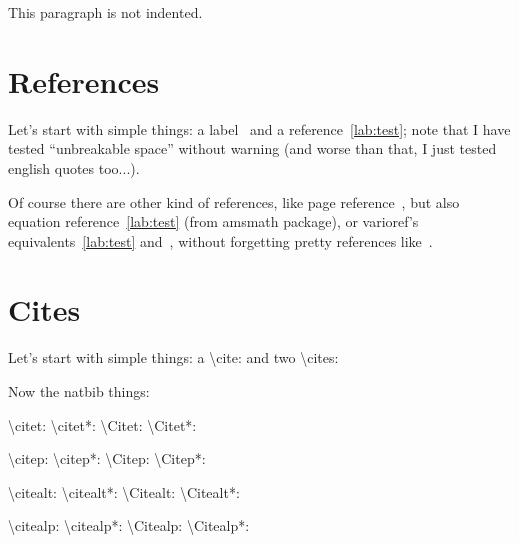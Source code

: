 \documentclass[a4paper,12pt]{article}
\begin{document}
\tableofcontents

\noindent This paragraph is not indented.

\section{References}

Let's start with simple things: a label~\label{lab:test} and a
reference~\ref{lab:test}; note that I have tested ``unbreakable
space'' without warning (and worse than that, I just tested english
quotes too...).

Of course there are other kind of references, like page
reference~\pageref{lab:test}, but also equation
reference~\eqref{lab:test} (from amsmath package), or varioref's
equivalents~\vref{lab:test} and~, without
forgetting pretty references like~.

\section{Cites}

Let's start with simple things: a \textbackslash{}cite: \cite[after]{article-crossref}
and two \textbackslash{}cites: \cite[after]{whole-set,article-crossref}

Now the natbib things:

\textbackslash{}citet: \citet[before][after]{article-crossref} \textbackslash{}citet{*}:
\citet*[before][after]{article-crossref} \textbackslash{}Citet: 
\textbackslash{}Citet{*}: 

\textbackslash{}citep: \citep[before][after]{article-crossref} \textbackslash{}citep{*}:
\citep*[before][after]{article-crossref} \textbackslash{}Citep: 
\textbackslash{}Citep{*}: 

\textbackslash{}citealt: \citealt[before][after]{article-crossref}
\textbackslash{}citealt{*}: \citealt*[before][after]{article-crossref}
\textbackslash{}Citealt: 
\textbackslash{}Citealt{*}: 

\textbackslash{}citealp: \citealp[before][after]{article-crossref}
\textbackslash{}citealp{*}: \citealp*[before][after]{article-crossref}
\textbackslash{}Citealp: 
\textbackslash{}Citealp{*}: 
\end{document}
